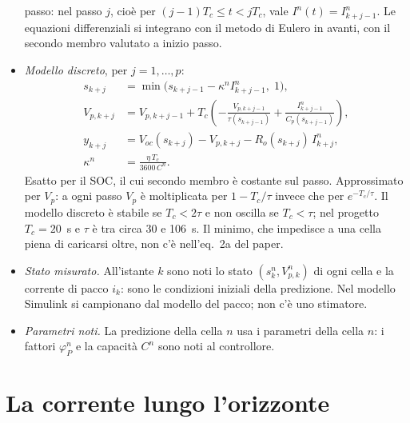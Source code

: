 \documentclass[11pt,a4paper]{article}
\newcommand{\Tc}{T_c}
\newcommand{\ip}[1]{\textbf{(H#1)}}         %
\begin{document}
\begin{itemize}
        passo: nel passo $j$, cioè per $(j-1)\Tc \le t < j\Tc$, vale
        $I^n(t) = I^n_{k+j-1}$. Le equazioni differenziali si integrano con il
        metodo di Eulero in avanti, con il secondo membro valutato a inizio
        passo.
  \item \emph{Modello discreto}, per $j = 1, \dots, p$:
        \[
        \begin{aligned}
          s_{k+j} &= \min\bigl(s_{k+j-1} - \kappa^n I^n_{k+j-1},\; 1\bigr) , \\
          V_{p,k+j} &= V_{p,k+j-1} + \Tc\left(-\frac{V_{p,k+j-1}}{\tau(s_{k+j-1})}
                      + \frac{I^n_{k+j-1}}{C_p(s_{k+j-1})}\right) , \\
          y_{k+j} &= V_{oc}(s_{k+j}) - V_{p,k+j} - R_o(s_{k+j})\, I^n_{k+j} , \\
          \kappa^n &= \frac{\eta\,\Tc}{3600\,C^n} .
        \end{aligned}
        \tag*{[L,~(2)--(5)]; eq.~2}
        \]
        Esatto per il SOC, il cui secondo membro è costante sul passo.
        Approssimato per $V_p$: a ogni passo $V_p$ è moltiplicata per
        $1 - \Tc/\tau$ invece che per $e^{-\Tc/\tau}$. Il modello discreto è
        stabile se $\Tc < 2\tau$ e non oscilla se $\Tc < \tau$; nel progetto
        $\Tc = 20$~s e $\tau$ è tra circa 30 e 106~s. Il minimo, che impedisce
        a una cella piena di caricarsi oltre, non c'è nell'eq.~2a del paper.
  \item[\ip{5}] \emph{Stato misurato.} All'istante $k$ sono noti lo stato
        $(s^n_k, V^n_{p,k})$ di ogni cella e la corrente di pacco $i_k$: sono
        le condizioni iniziali della predizione. Nel modello Simulink si
        campionano dal modello del pacco; non c'è uno stimatore.
  \item[\ip{6}] \emph{Parametri noti.} La predizione della cella $n$ usa i
        parametri della cella $n$: i fattori $\varphi^n_P$ e la capacità $C^n$ sono
        noti al controllore.
\end{itemize}

\section{La corrente lungo l'orizzonte}\label{sec:orizzonte}
\end{document}
